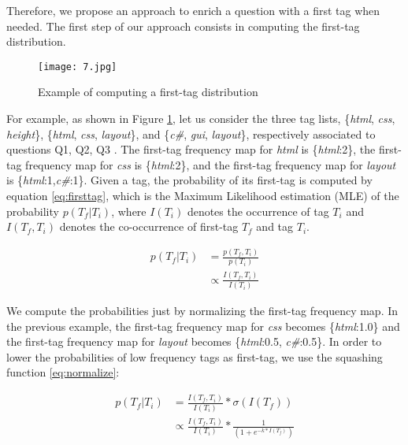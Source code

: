 Therefore, we propose an approach to enrich a question with a first tag when needed. The first step of our approach consists in computing the first-tag distribution.



\begin{figure}[htp]
\centering
\texttt{[image: 7.jpg]}  
\caption{Example of computing a first-tag distribution}
\label{fig:examplefirsttag} 
\end{figure}
For example, as shown in Figure \ref{fig:examplefirsttag}, let us consider the three tag lists, \{\textit{html}, \textit{css}, \textit{height}\},  \{\textit{html}, \textit{css}, \textit{layout}\}, and \{\textit{c\#}, \textit{gui}, \textit{layout}\}, respectively associated to questions Q1, Q2, Q3 . The first-tag frequency map for \textit{html} is \{\textit{html}:2\}, the first-tag frequency map for \textit{css} is \{\textit{html}:2\}, and the first-tag frequency map for \textit{layout} is \{\textit{html}:1,\textit{c\#}:1\}. Given a tag, the probability of its first-tag is computed by equation \ref{eq:firsttag}, which is the Maximum Likelihood estimation (MLE) of the probability $p(T_f|T_i)$, where $I(T_i)$ denotes the occurrence of tag $T_i$ and $I(T_f,T_i)$ denotes the co-occurrence of first-tag $T_f$ and tag $T_i$.

\begin{equation}
\begin{split}
p(T_f|T_i)  &=\frac{p(T_f,T_i) }{p(T_i)} \\
                  &\propto \frac{I(T_f,T_i)}{I(T_i)}
\label{eq:firsttag}
\end{split}
\end{equation}


We compute the probabilities just by normalizing the first-tag frequency map. In the previous example, the first-tag frequency map for \textit{css} becomes \{\textit{html}:1.0\} and the first-tag frequency map for \textit{layout} becomes \{\textit{html}:0.5, \textit{c\#}:0.5\}. In order to lower the probabilities of low frequency tags as first-tag, we use the squashing function \ref{eq:normalize}:


\begin{equation}
\begin{split}
p(T_f|T_i) &=\frac{I(T_f,T_i)}{I(T_i)}*\sigma(I(T_f)) \\
                  &\propto \frac{I(T_f,T_i)}{I(T_i)}*\frac{1}{(1+e^{-k*I(T_f)})}
\label{eq:normalize}
\end{split}
\end{equation}

